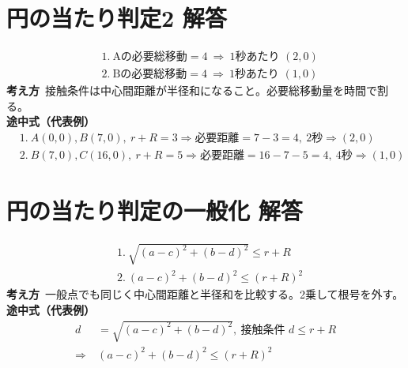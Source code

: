 \documentclass[paper=b4j,landscape,twocolumn,fleqn]{jlreq}
\begin{document}
\newpage
\section{円の当たり判定2 解答}
\begin{align*}
&1.\ \text{Aの必要総移動}=4\ \Rightarrow\ 1\text{秒あたり }(2,0)\\
&2.\ \text{Bの必要総移動}=4\ \Rightarrow\ 1\text{秒あたり }(1,0)
\end{align*}
\textbf{考え方}\
接触条件は中心間距離が半径和になること。必要総移動量を時間で割る。\\
\textbf{途中式（代表例）}
\begin{align*}
&1.\ A(0,0),B(7,0),\ r+R=3\Rightarrow \text{必要距離}=7-3=4,\ 2\text{秒} \Rightarrow (2,0)\\
&2.\ B(7,0),C(16,0),\ r+R=5\Rightarrow \text{必要距離}=16-7-5=4,\ 4\text{秒} \Rightarrow (1,0)
\end{align*}

\newpage
\section{円の当たり判定の一般化 解答}
\begin{align*}
&1.\ \sqrt{(a-c)^2+(b-d)^2}\le r+R\\
&2.\ (a-c)^2+(b-d)^2\le (r+R)^2
\end{align*}
\textbf{考え方}\
一般点でも同じく中心間距離と半径和を比較する。2乗して根号を外す。\\
\textbf{途中式（代表例）}
\begin{align*}
d&=\sqrt{(a-c)^2+(b-d)^2},\ \text{接触条件 }d\le r+R\\
\Rightarrow\ &(a-c)^2+(b-d)^2\le (r+R)^2
\end{align*}
\end{document}
